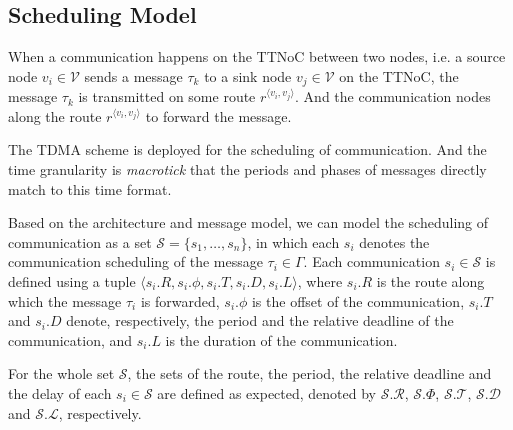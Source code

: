 \documentclass[journal]{IEEEtran}
\newcommand{\calV}{\mathcal{V}}
\newcommand{\calL}{\mathcal{L}}
\newcommand{\calS}{\mathcal{S}}
\newcommand{\calR}{\mathcal{R}}
\newcommand{\calD}{\mathcal{D}}
\newcommand{\calT}{\mathcal{T}}
\newcommand{\route}[3]{#1^{\langle #2,#3\rangle}}
\begin{document}
\subsection{Scheduling Model}

When a communication happens on the TTNoC between two nodes, 
i.e. a source node $v_i\in \calV$ sends a message $\tau_{k}$ to a sink node $v_j\in \calV$ on the TTNoC, the message $\tau_k$ is transmitted on some route
$\route{r}{v_i}{v_j}$.  
And the communication nodes along the route $\route{r}{v_i}{v_j}$ to forward the message.

The TDMA scheme is deployed for the scheduling of communication.
And the time granularity is \emph{macrotick} that the periods and phases of messages directly match to this time format.

Based on the architecture and message model, we can model the scheduling of communication as a set $\calS=\{s_1,\ldots,s_n\}$, in which each
$s_{i}$ denotes the communication scheduling of the message
$\tau_{i}\in\Gamma$. Each communication $s_{i}\in\calS$ is defined
using a tuple $\langle s_i.R, s_i.\phi, s_i.T, s_i.D, s_i.L\rangle$,
where $s_i.R$ is the route along which the message $\tau_i$ is
forwarded, 
$s_i.\phi$ is the offset of the communication, $s_i.T$ and
$s_i.D$ denote, 
respectively, 
the period and the relative deadline of the communication, and $s_i.L$ is the duration of the communication.

For the whole set $\calS$, the sets of the route, the period, the
relative deadline and the delay of each $s_i\in\calS$ are defined as
expected, denoted by $\calS.\calR$, $\calS.\Phi$, $\calS.\calT$,
$\calS.\calD$ and $\calS.\calL$, respectively.

\end{document}
